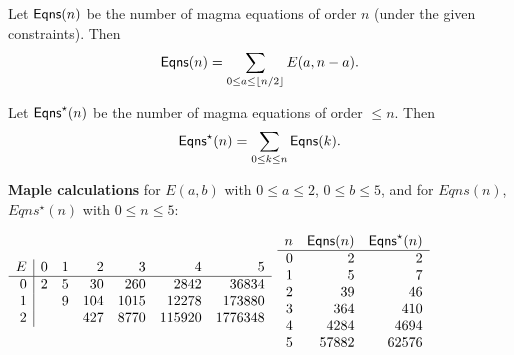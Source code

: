 \documentclass[12pt]{amsart}
\newcommand{\Eqns}{{\sf Eqns}}
\begin{document}
Let $\Eqns(n)$ be the number of magma equations of order $n$ (under the given constraints). Then
$$
\Eqns (n) = \sum_{0 \le a \le \lfloor n/2 \rfloor } E(a,n-a) .
$$

Let $\Eqns^\star(n)$ be the number of magma equations of order $\le n$. Then
$$
\Eqns^\star(n) = \sum_{0 \le k \le n} \Eqns (k) .
$$

{\bf Maple calculations} for $E(a,b)$ with $0\le a \le 2$, $0 \le b \le 5$, and for
$Eqns(n)$, $Eqns^\star(n)$ with $0\le n \le 5$:
\bigskip

$
\begin{array}{ r | r  r  r  r  r  r}
E& 0 & 1 & 2 & 3 & 4 & 5\\
\hline
0& 2 & 5 & 30 & 260 & 2842 & 36834\\
1&  & 9 & 104 & 1015 & 12278 & 173880\\
2&  &  & 427 & 8770 & 115920 & 1776348\\
\end{array}
$
\qquad
$
\begin{array} {r r r}
n &\Eqns(n) & \Eqns^\star(n)\\
\hline
0 & 2 & 2\\
1 & 5 & 7\\
2 & 39 & 46\\
3 & 364 & 410\\
4 & 4284 & 4694\\
5 & 57882 & 62576
\end{array}
$
\end{document}
